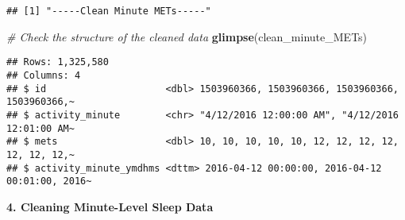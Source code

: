 \documentclass[
]{article}
\newenvironment{Shaded}{\begin{snugshade}}{\end{snugshade}}
\newcommand{\AttributeTok}[1]{\textcolor[rgb]{0.13,0.29,0.53}{#1}}
\newcommand{\CommentTok}[1]{\textcolor[rgb]{0.56,0.35,0.01}{\textit{#1}}}
\newcommand{\FunctionTok}[1]{\textcolor[rgb]{0.13,0.29,0.53}{\textbf{#1}}}
\newcommand{\NormalTok}[1]{#1}
\newcommand{\OtherTok}[1]{\textcolor[rgb]{0.56,0.35,0.01}{#1}}
\newcommand{\SpecialCharTok}[1]{\textcolor[rgb]{0.81,0.36,0.00}{\textbf{#1}}}
\newcommand{\StringTok}[1]{\textcolor[rgb]{0.31,0.60,0.02}{#1}}
\begin{document}
\begin{Shaded}
\end{Shaded}

\begin{verbatim}
## [1] "-----Clean Minute METs-----"
\end{verbatim}

\begin{Shaded}
\begin{Highlighting}[]
\CommentTok{\# Check the structure of the cleaned data}
\FunctionTok{glimpse}\NormalTok{(clean\_minute\_METs)}
\end{Highlighting}
\end{Shaded}

\begin{verbatim}
## Rows: 1,325,580
## Columns: 4
## $ id                     <dbl> 1503960366, 1503960366, 1503960366, 1503960366,~
## $ activity_minute        <chr> "4/12/2016 12:00:00 AM", "4/12/2016 12:01:00 AM~
## $ mets                   <dbl> 10, 10, 10, 10, 10, 12, 12, 12, 12, 12, 12, 12,~
## $ activity_minute_ymdhms <dttm> 2016-04-12 00:00:00, 2016-04-12 00:01:00, 2016~
\end{verbatim}

\textbf{4. Cleaning Minute-Level Sleep Data}
\end{document}
